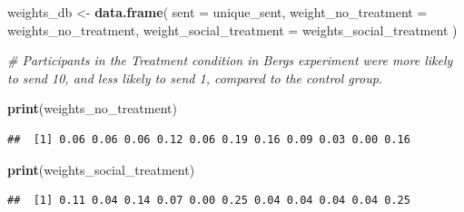 \documentclass[
]{article}
\newenvironment{Shaded}{\begin{snugshade}}{\end{snugshade}}
\newcommand{\AttributeTok}[1]{\textcolor[rgb]{0.13,0.29,0.53}{#1}}
\newcommand{\CommentTok}[1]{\textcolor[rgb]{0.56,0.35,0.01}{\textit{#1}}}
\newcommand{\FunctionTok}[1]{\textcolor[rgb]{0.13,0.29,0.53}{\textbf{#1}}}
\newcommand{\NormalTok}[1]{#1}
\newcommand{\OtherTok}[1]{\textcolor[rgb]{0.56,0.35,0.01}{#1}}
\begin{document}
\begin{Shaded}
\begin{Highlighting}[]
\NormalTok{weights\_db }\OtherTok{\textless{}{-}} \FunctionTok{data.frame}\NormalTok{(}
  \AttributeTok{sent =}\NormalTok{ unique\_sent,}
  \AttributeTok{weight\_no\_treatment =}\NormalTok{ weights\_no\_treatment,}
  \AttributeTok{weight\_social\_treatment =}\NormalTok{ weights\_social\_treatment}
\NormalTok{)}

\CommentTok{\# Participants in the Treatment condition in Berg\textquotesingle{}s experiment were more likely to send 10, and less likely to send 1, compared to the control group.}

\FunctionTok{print}\NormalTok{(weights\_no\_treatment)}
\end{Highlighting}
\end{Shaded}

\begin{verbatim}
##  [1] 0.06 0.06 0.06 0.12 0.06 0.19 0.16 0.09 0.03 0.00 0.16
\end{verbatim}

\begin{Shaded}
\begin{Highlighting}[]
\FunctionTok{print}\NormalTok{(weights\_social\_treatment)}
\end{Highlighting}
\end{Shaded}

\begin{verbatim}
##  [1] 0.11 0.04 0.14 0.07 0.00 0.25 0.04 0.04 0.04 0.04 0.25
\end{verbatim}
\end{document}
